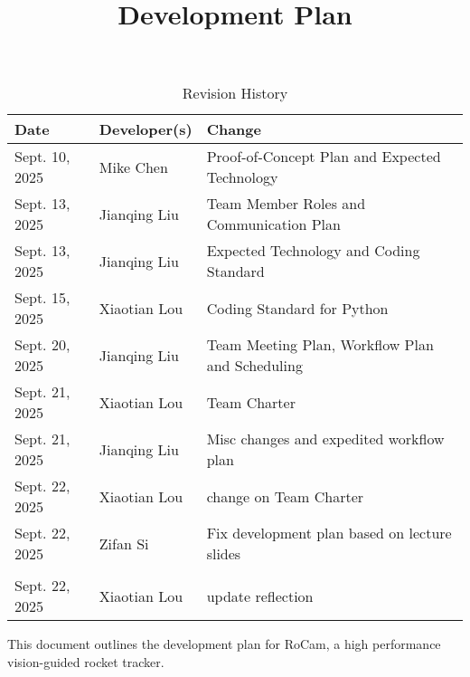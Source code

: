 \documentclass{article}
\title{Development Plan\\\progname}
\author{\authname}
\date{}
\begin{document}
\maketitle

\begin{table}[hp]
  \caption{Revision History} \label{TblRevisionHistory}
  \begin{tabularx}{\textwidth}{llX}
    \toprule
    \textbf{Date}  & \textbf{Developer(s)} & \textbf{Change}                                 \\
    \midrule
    Sept. 10, 2025 & Mike Chen             & Proof-of-Concept Plan and Expected Technology   \\
    Sept. 13, 2025 & Jianqing Liu          & Team Member Roles and Communication Plan        \\
    Sept. 13, 2025 & Jianqing Liu          & Expected Technology and Coding Standard         \\
    Sept. 15, 2025 & Xiaotian Lou          & Coding Standard for Python                      \\
    Sept. 20, 2025 & Jianqing Liu          & Team Meeting Plan, Workflow Plan and Scheduling \\
    Sept. 21, 2025 & Xiaotian Lou          & Team Charter                                    \\
    Sept. 21, 2025 & Jianqing Liu          & Misc changes and expedited workflow plan        \\
    Sept. 22, 2025 & Xiaotian Lou          & change on Team Charter                          \\
    Sept. 22, 2025 & Zifan Si              & Fix development plan based on lecture slides    \\                          \\
    Sept. 22, 2025 & Xiaotian Lou          & update reflection                               \\
    \bottomrule
  \end{tabularx}
\end{table}

\newpage{}

This document outlines the development plan for RoCam, a high performance
vision-guided rocket tracker.


\end{document}
